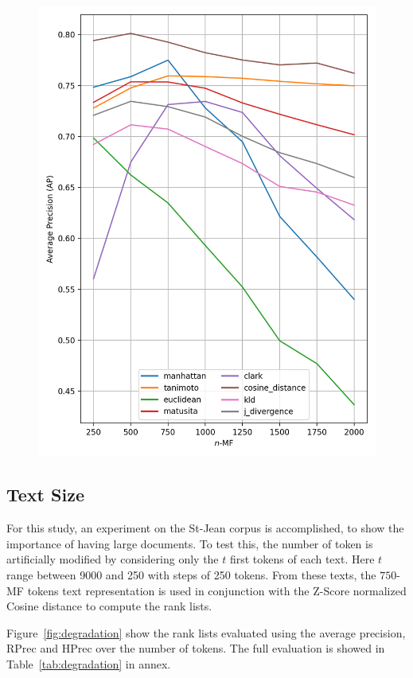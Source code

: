 \begin{figure}
  \label{fig:lemmas}
  \includegraphics[width=0.9\linewidth]{img/mf_lemmas.png}
\end{figure}

\subsection{Text Size\label{sec:importance_of_text_size}}

For this study, an experiment on the St-Jean corpus is accomplished, to show the importance of having large documents.
To test this, the number of token is artificially modified by considering only the $t$ first tokens of each text.
Here $t$ range between 9000 and 250 with steps of 250 tokens.
From these texts, the $750$-MF tokens text representation is used in conjunction with the Z-Score normalized Cosine distance to compute the rank lists.

Figure~\ref{fig:degradation} show the rank lists evaluated using the average precision, RPrec and HPrec over the number of tokens.
The full evaluation is showed in Table~\ref{tab:degradation} in annex.


